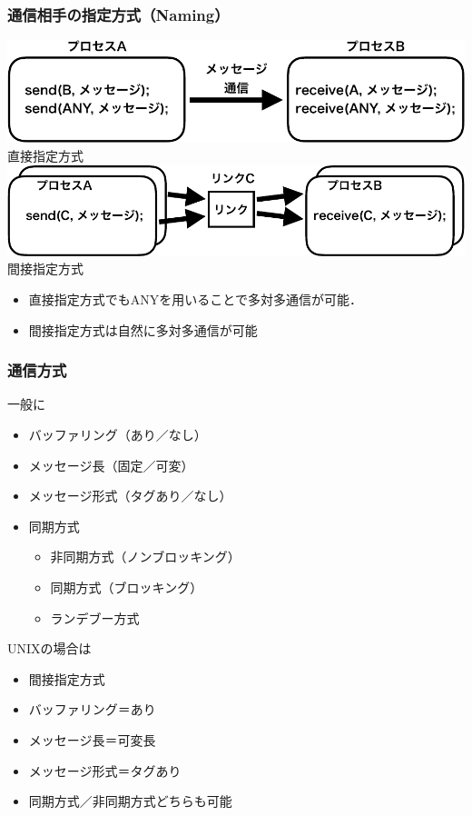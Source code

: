 \documentclass[dvipdfmx]{beamer}
\begin{document}
\begin{frame}
  \frametitle{通信相手の指定方式（Naming）}
  \begin{center}
    \includegraphics[scale=0.6]{Fig/ipcDirect-crop.pdf}\\
    直接指定方式
    \includegraphics[scale=0.6]{Fig/ipcIndirect-crop.pdf}\\
    間接指定方式
  \end{center}
  \begin{itemize}
  \item 直接指定方式でもANYを用いることで多対多通信が可能．
  \item 間接指定方式は自然に多対多通信が可能
  \end{itemize}
\end{frame}

\begin{frame}
  \frametitle{通信方式}
  一般に
  \begin{itemize}
  \item バッファリング（あり／なし）
  \item メッセージ長（固定／可変）
  \item メッセージ形式（タグあり／なし）
  \item 同期方式
    \begin{itemize}
    \item 非同期方式（ノンブロッキング）
    \item 同期方式（ブロッキング）
    \item ランデブー方式
    \end{itemize}
  \end{itemize}

  UNIXの場合は
  \begin{itemize}
  \item 間接指定方式
  \item バッファリング＝あり
  \item メッセージ長＝可変長
  \item メッセージ形式＝タグあり
  \item 同期方式／非同期方式どちらも可能
  \end{itemize}
\end{frame}
\end{document}
